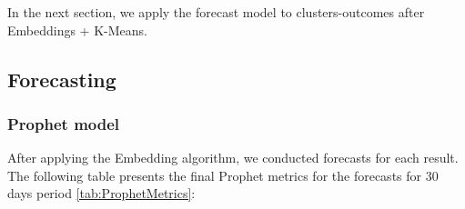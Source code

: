 In the next section, we apply the forecast model to clusters-outcomes after Embeddings + K-Means.


\subsection{Forecasting}




\subsubsection{Prophet model}

After applying the Embedding algorithm, we conducted forecasts for each result. The following table presents the final Prophet metrics for the forecasts for 30 days period \ref{tab:ProphetMetrics}:

